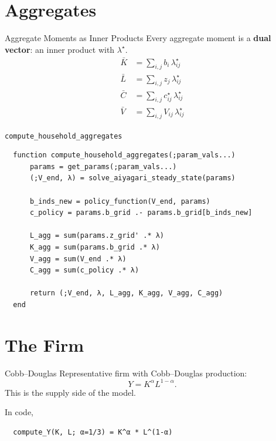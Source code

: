 \documentclass[10pt,aspectratio=169]{beamer}
\begin{document}
\section{Aggregates}

\begin{frame}{Aggregate Moments as Inner Products}
  Every aggregate moment is a \textbf{dual vector}: an inner product with $\lambda^\star$.
  \begin{align*}
    \bar K &= \sum_{i,j} b_i \, \lambda^\star_{ij} \\
    \bar L &= \sum_{i,j} z_j \, \lambda^\star_{ij}        \\
    \bar C &= \sum_{i,j} c^\star_{ij} \, \lambda^\star_{ij} \\
    \bar V &= \sum_{i,j} V_{ij} \, \lambda^\star_{ij}
  \end{align*}
\end{frame}

\begin{frame}[fragile]{\texttt{compute\_household\_aggregates}}
  \begin{lstlisting}
  function compute_household_aggregates(;param_vals...)
      params = get_params(;param_vals...)
      (;V_end, λ) = solve_aiyagari_steady_state(params)

      b_inds_new = policy_function(V_end, params)
      c_policy = params.b_grid .- params.b_grid[b_inds_new]

      L_agg = sum(params.z_grid' .* λ)
      K_agg = sum(params.b_grid .* λ)
      V_agg = sum(V_end .* λ)
      C_agg = sum(c_policy .* λ)

      return (;V_end, λ, L_agg, K_agg, V_agg, C_agg)
  end
  \end{lstlisting}
\end{frame}

\section{The Firm}

\begin{frame}[fragile]{Cobb--Douglas}
  Representative firm with Cobb--Douglas production:
  \[
    Y = K^\alpha L^{1-\alpha}.
  \]
  This is the supply side of the model.

  In code,
  \begin{lstlisting}
  compute_Y(K, L; α=1/3) = K^α * L^(1-α)
  \end{lstlisting}
\end{frame}
\end{document}
